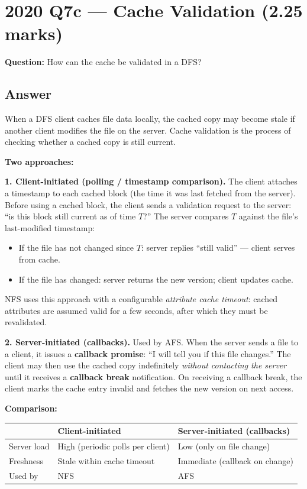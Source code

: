 \documentclass[12pt,a4paper]{article}
\begin{document}
\section{2020 Q7c --- Cache Validation (2.25 marks)}

\textbf{Question:} How can the cache be validated in a DFS?

\subsection*{Answer}

When a DFS client caches file data locally, the cached copy may become stale if another client modifies the file on the server. Cache validation is the process of checking whether a cached copy is still current.

\textbf{Two approaches:}

\textbf{1. Client-initiated (polling / timestamp comparison).}
The client attaches a timestamp to each cached block (the time it was last fetched from the server). Before using a cached block, the client sends a validation request to the server: ``is this block still current as of time $T$?'' The server compares $T$ against the file's last-modified timestamp:
\begin{itemize}[noitemsep]
  \item If the file has not changed since $T$: server replies ``still valid'' --- client serves from cache.
  \item If the file has changed: server returns the new version; client updates cache.
\end{itemize}
NFS uses this approach with a configurable \emph{attribute cache timeout}: cached attributes are assumed valid for a few seconds, after which they must be revalidated.

\textbf{2. Server-initiated (callbacks).}
Used by AFS. When the server sends a file to a client, it issues a \textbf{callback promise}: ``I will tell you if this file changes.'' The client may then use the cached copy indefinitely \emph{without contacting the server} until it receives a \textbf{callback break} notification. On receiving a callback break, the client marks the cache entry invalid and fetches the new version on next access.

\textbf{Comparison:}
\begin{center}
\begin{tabular}{@{}lll@{}}
\toprule
 & Client-initiated & Server-initiated (callbacks) \\
\midrule
Server load & High (periodic polls per client) & Low (only on file change) \\
Freshness & Stale within cache timeout & Immediate (callback on change) \\
Used by & NFS & AFS \\
\bottomrule
\end{tabular}
\end{center}
\end{document}
